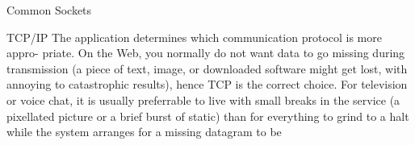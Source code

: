 \begin{questions}{Common Sockets}
	\begin{questionAnswer}
	\end{questionAnswer}
\end{questions}

\begin{questions}{TCP/IP}
The application determines which communication protocol is more appro-
priate. On the Web, you normally do not want data to go missing during
transmission (a piece of text, image, or downloaded software might get lost,
with annoying to catastrophic results), hence TCP is the correct choice. For television or voice chat, it is usually preferrable to live with small breaks in the service (a pixellated picture or a brief burst of static) than for everything to grind to a halt while the system arranges for a missing datagram to be


\end{questions}
